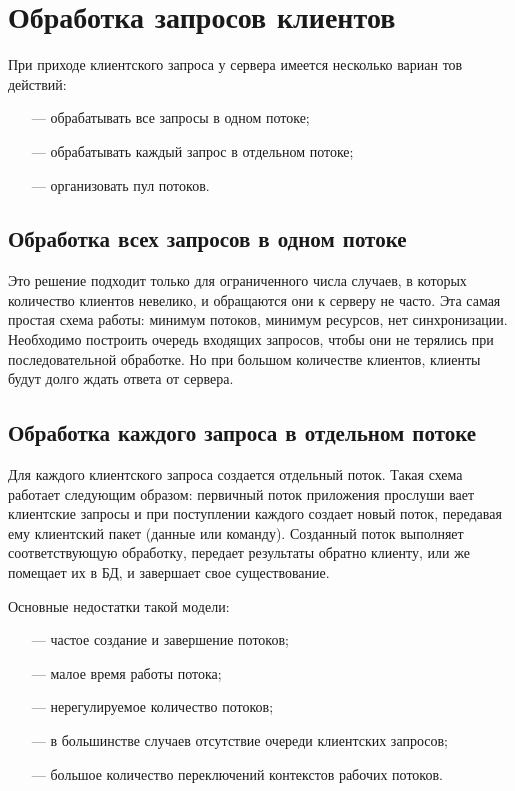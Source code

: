 \section{Обработка запросов клиентов}

При приходе клиентского запроса у сервера имеется несколько вариан­
тов действий:

\begin{itemize}
	\item[---] обрабатывать все запросы в одном потоке;
	\item[---] обрабатывать каждый запрос в отдельном потоке;
	\item[---] организовать пул потоков.
\end{itemize}

\subsection{Обработка всех запросов в одном потоке}

Это решение подходит только для ограниченного числа случаев, в которых количество клиентов невелико, и обращаются они к серверу не часто. Эта самая простая схема работы: минимум потоков, минимум ресурсов, нет синхронизации. Необходимо построить очередь входящих запросов, чтобы они не терялись при последовательной обработке. Но при большом количестве клиентов, клиенты будут долго ждать ответа от сервера.

\subsection{Обработка каждого запроса в отдельном потоке}

Для каждого клиентского запроса создается отдельный поток. Такая схема работает следующим образом: первичный поток приложения прослуши­ вает клиентские запросы и при поступлении каждого создает новый поток, передавая ему клиентский пакет (данные или команду). Созданный поток выполняет соответствующую обработку, передает результаты обратно клиенту, или же помещает их в БД, и завершает свое существование.

Основные недостатки такой модели:

\begin{itemize}
	\item[---] частое создание и завершение потоков;
	\item[---] малое время работы потока;
	\item[---] нерегулируемое количество потоков;
	\item[---] в большинстве случаев отсутствие очереди клиентских запросов;
	\item[---] большое количество переключений контекстов рабочих потоков.			
\end{itemize}

